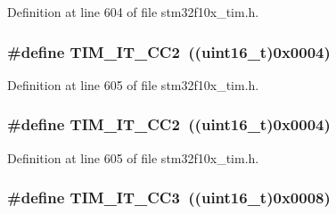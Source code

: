 Definition at line 604 of file stm32f10x\+\_\+tim.\+h.

\subsubsection[{\texorpdfstring{T\+I\+M\+\_\+\+I\+T\+\_\+\+C\+C2}{TIM_IT_CC2}}]{\setlength{\rightskip}{0pt plus 5cm}\#define T\+I\+M\+\_\+\+I\+T\+\_\+\+C\+C2~(({\bf uint16\+\_\+t})0x0004)}\hypertarget{group___t_i_m__interrupt__sources_ga60f6b6c424b62ca58d3fafd8f5955e4f}{}\label{group___t_i_m__interrupt__sources_ga60f6b6c424b62ca58d3fafd8f5955e4f}


Definition at line 605 of file stm32f10x\+\_\+tim.\+h.

\subsubsection[{\texorpdfstring{T\+I\+M\+\_\+\+I\+T\+\_\+\+C\+C2}{TIM_IT_CC2}}]{\setlength{\rightskip}{0pt plus 5cm}\#define T\+I\+M\+\_\+\+I\+T\+\_\+\+C\+C2~(({\bf uint16\+\_\+t})0x0004)}\hypertarget{group___t_i_m__interrupt__sources_ga60f6b6c424b62ca58d3fafd8f5955e4f}{}\label{group___t_i_m__interrupt__sources_ga60f6b6c424b62ca58d3fafd8f5955e4f}


Definition at line 605 of file stm32f10x\+\_\+tim.\+h.

\subsubsection[{\texorpdfstring{T\+I\+M\+\_\+\+I\+T\+\_\+\+C\+C3}{TIM_IT_CC3}}]{\setlength{\rightskip}{0pt plus 5cm}\#define T\+I\+M\+\_\+\+I\+T\+\_\+\+C\+C3~(({\bf uint16\+\_\+t})0x0008)}\hypertarget{group___t_i_m__interrupt__sources_ga6aef020aebafd9e585283fbbaf8b841f}{}\label{group___t_i_m__interrupt__sources_ga6aef020aebafd9e585283fbbaf8b841f}


